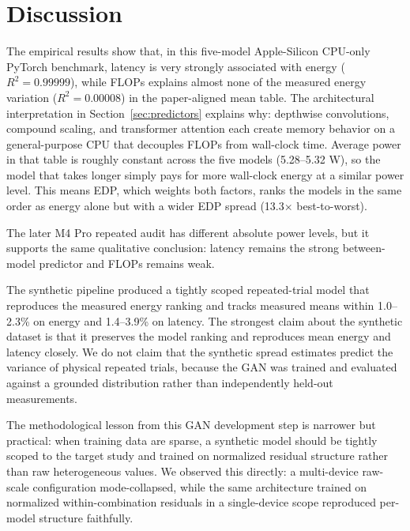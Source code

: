 \documentclass{svproc}
\begin{document}
\section{Discussion}
The empirical results show that, in this five-model Apple-Silicon CPU-only
PyTorch benchmark, latency is very strongly associated with energy
($R^2 = 0.99999$), while FLOPs explains almost none of the measured energy
variation ($R^2 = 0.00008$) in the paper-aligned mean table. The architectural
interpretation in Section~\ref{sec:predictors} explains why: depthwise
convolutions, compound scaling, and transformer attention each create memory
behavior on a general-purpose CPU that decouples FLOPs from wall-clock time.
Average power in that table is roughly constant across the five models
(5.28--5.32 W), so
the model that takes longer simply pays for more wall-clock energy at a
similar power level. This means EDP, which weights both factors, ranks the
models in the same order as energy alone but with a wider EDP spread
(13.3$\times$ best-to-worst).

The later M4 Pro repeated audit has different absolute power levels, but it
supports the same qualitative conclusion: latency remains the strong
between-model predictor and FLOPs remains weak.

The synthetic pipeline produced a tightly scoped repeated-trial model that
reproduces the measured energy ranking and tracks measured means within
1.0--2.3\% on energy and 1.4--3.9\% on latency. The strongest claim about
the synthetic dataset is that it preserves the model ranking and reproduces
mean energy and latency closely. We do not claim that the synthetic spread
estimates predict the variance of physical repeated trials, because the GAN
was trained and evaluated against a grounded distribution rather than
independently held-out measurements.

The methodological lesson from this GAN development step is narrower but
practical: when training data are sparse, a synthetic model should be tightly
scoped to the target study and trained on normalized residual structure rather
than raw heterogeneous values. We observed this directly: a multi-device
raw-scale configuration mode-collapsed, while the same architecture trained
on normalized within-combination residuals in a single-device scope reproduced
per-model structure faithfully.
\end{document}
